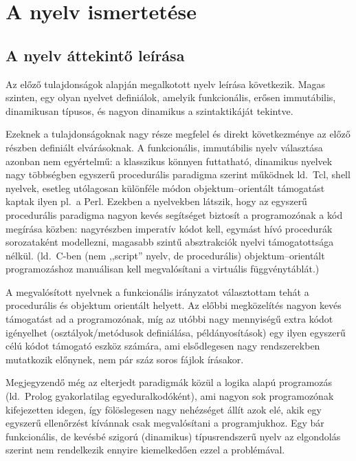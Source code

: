 \documentclass[magyar,12pt,a4paper,final,titlepage]{report}
\def\pl{pl.\ }
\def\ld{ld.\ }
\begin{document}
    \chapter{A nyelv ismertetése}

    \section{A nyelv áttekintő leírása}\label{sec:c4}

    Az előző tulajdonságok alapján megalkotott nyelv leírása következik.
    Magas szinten, egy olyan nyelvet definiálok, amelyik funkcionális, erősen immutábilis, dinamikusan típusos, és nagyon dinamikus a szintaktikáját tekintve.

    Ezeknek a tulajdonságoknak nagy része megfelel és direkt következménye az előző részben definiált elvárásoknak.
    A funkcionális, immutábilis nyelv választása azonban nem egyértelmű: a klasszikus könnyen futtatható, dinamikus nyelvek nagy többségben egyszerű procedurális paradigma szerint működnek \ld Tcl, shell nyelvek, esetleg utólagosan különféle módon objektum--orientált támogatást kaptak ilyen \pl a Perl.
    Ezekben a nyelvekben látszik, hogy az egyszerű procedurális paradigma nagyon kevés segítséget biztosít a programozónak a kód megírása közben: nagyrészben imperatív kódot kell, egymást hívó procedurák sorozataként modellezni, magasabb szintű absztrakciók nyelvi támogatottsága nélkül.
    (\ld C-ben (nem ,,script'' nyelv, de procedurális) objektum--orientált programozáshoz manuálisan kell megvalósítani a virtuális függvénytáblát.)

    A megvalósított nyelvnek a funkcionális irányzatot választottam tehát a procedurális és objektum orientált helyett.
    Az előbbi megközelítés nagyon kevés támogatást ad a programozónak, míg az utóbbi nagy mennyiségű extra kódot igényelhet (osztályok/metódusok definiálása, példányosítások) egy ilyen egyszerű célú kódot támogató eszköz számára, ami elsődlegesen nagy rendszerekben mutatkozik előnynek, nem pár száz soros fájlok írásakor.

    Megjegyzendő még az elterjedt paradigmák közül a logika alapú programozás (\ld Prolog gyakorlatilag egyeduralkodóként), ami nagyon sok programozónak kifejezetten idegen, így fölöslegesen nagy nehézséget állít azok elé, akik egy egyszerű ellenőrzést kívánnak csak megvalósítani a programjukhoz.
    Egy bár funkcionális, de kevésbé szigorú (dinamikus) típusrendszerű nyelv az elgondolás szerint nem rendelkezik ennyire kiemelkedően ezzel a problémával.
\end{document}
